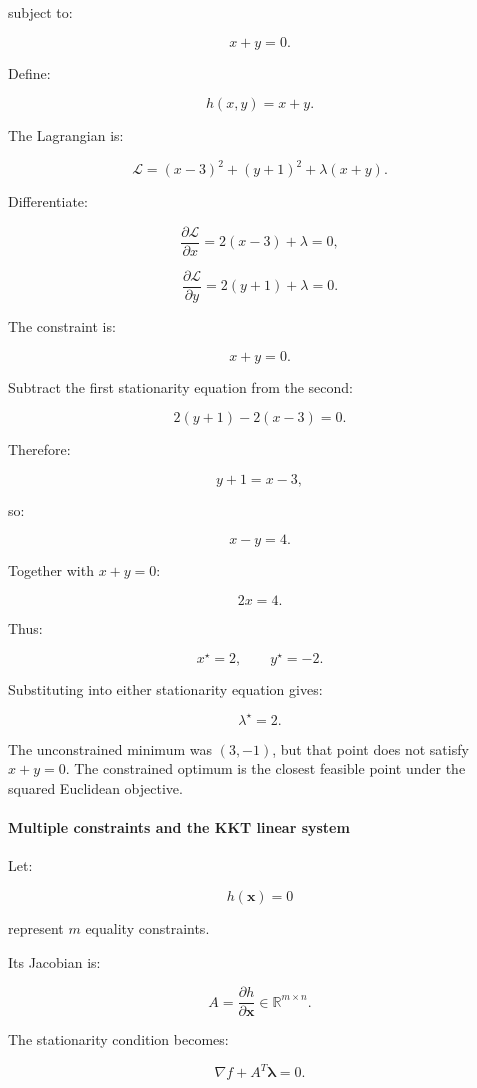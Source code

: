 subject to:

\[
x+y=0.
\]

Define:

\[
h(x,y)=x+y.
\]

The Lagrangian is:

\[
\mathcal L= (x-3)^2+(y+1)^2+\lambda(x+y).
\]

Differentiate:

\[
\frac{\partial\mathcal L}{\partial x} = 2(x-3)+\lambda=0,
\]

\[
\frac{\partial\mathcal L}{\partial y} = 2(y+1)+\lambda=0.
\]

The constraint is:

\[
x+y=0.
\]

Subtract the first stationarity equation from the second:

\[
2(y+1)-2(x-3)=0.
\]

Therefore:

\[
y+1=x-3,
\]

so:

\[
x-y=4.
\]

Together with \(x+y=0\):

\[
2x=4.
\]

Thus:

\[
\boxed{x^\star=2,\qquad y^\star=-2}.
\]

Substituting into either stationarity equation gives:

\[
\boxed{\lambda^\star=2}.
\]

The unconstrained minimum was \((3,-1)\), but that point does not satisfy \(x+y=0\). The constrained optimum is the closest feasible point under the squared Euclidean objective.

\paragraph{Multiple constraints and the KKT linear system}\label{02-foundations-ii-ch026-multiple-constraints-and-the-kkt-linear-system}

Let:

\[
h(\mathbf x)=0
\]

represent \(m\) equality constraints.

Its Jacobian is:

\[
A=\frac{\partial h}{\partial\mathbf x} \in\mathbb R^{m\times n}.
\]

The stationarity condition becomes:

\[
\nabla f+A^T\boldsymbol\lambda=0.
\]

